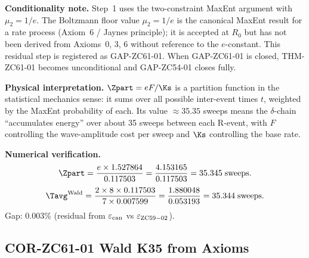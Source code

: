 \documentclass[12pt, a4paper]{article}
\begin{document}
\begin{formalbox}[title={THM-ZC61-01: Partition Function Identity
  $\Tavg = \Zpart = eF/\Ks$ ($R_0$, Near-Formal)}]
\textbf{Conditionality note.}
Step~1 uses the two-constraint MaxEnt argument with
$\mu_2 = 1/e$.
The Boltzmann floor value $\mu_2 = 1/e$ is the canonical
MaxEnt result for a rate process (Axiom~6 / Jaynes principle);
it is accepted at $R_0$ but has not been derived from
Axioms~0, 3, 6 without reference to the $e$-constant.
This residual step is registered as GAP-ZC61-01.
When GAP-ZC61-01 is closed, THM-ZC61-01 becomes
unconditional and GAP-ZC54-01 closes fully.

\textbf{Physical interpretation.}
$\Zpart = eF/\Ks$ is a partition function in the statistical
mechanics sense: it sums over all possible inter-event
times $t$, weighted by the MaxEnt probability of each.
Its value $\approx 35.35$ sweeps means the $\delta$-chain
``accumulates energy'' over about 35 sweeps between each
R-event, with $F$ controlling the wave-amplitude cost per
sweep and $\Ks$ controlling the base rate.

\textbf{Numerical verification.}
\[
  \Zpart = \frac{e \times 1.527864}{0.117503}
  = \frac{4.153165}{0.117503}
  = 35.345 \;\text{sweeps}.
\]
\[
  \Tavg^{\rm Wald}
  = \frac{2 \times 8 \times 0.117503}{7 \times 0.007599}
  = \frac{1.880048}{0.053193}
  = 35.344 \;\text{sweeps}.
\]
Gap: $0.003\%$ (residual from $\varepsilon_{\rm can}$ vs $\varepsilon_{\rm ZC59-02}$).
\end{formalbox}

\subsection{COR-ZC61-01 \quad Wald K35 from Axioms}
\label{sec:cor01}

\end{document}
